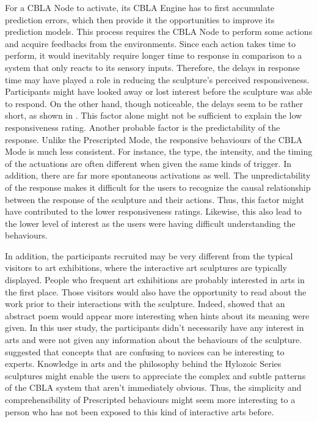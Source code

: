 For a CBLA Node to activate, its CBLA Engine has to first accumulate prediction errors, which then provide it the opportunities to improve its prediction models. This process requires the CBLA Node to perform some actions and acquire feedbacks from the environments. Since each action takes time to perform, it would inevitably require longer time to response in comparison to a system that only reacts to its sensory inputs.
Therefore, the delays in response time may have played a role in reducing the sculpture's perceived responsiveness. Participants might have looked away or lost interest before the sculpture was able to respond. 
On the other hand, though noticeable, the delays seem to be rather short, as shown in . This factor alone might not be sufficient to explain the low responsiveness rating. Another probable factor is the predictability of the response. Unlike the Prescripted Mode, the responsive behaviours of the CBLA Mode is much less consistent. For instance, the type,  the intensity, and the timing of the actuations are often different when given the same kinds of trigger. In addition, there are far more spontaneous activations as well. The unpredictability of the response makes it difficult for the users to recognize the causal relationship between the response of the sculpture and their actions. Thus, this factor might have contributed to the lower responsiveness ratings. Likewise, this also lead to the lower level of interest as the users were having difficult understanding the behaviours. 

In addition, the participants recruited may be very different from the typical visitors to art exhibitions, where the interactive art sculptures are typically displayed. People who frequent art exhibitions are probably interested in arts in the first place. Those visitors would also have the opportunity to read about the work prior to their interactions with the sculpture. Indeed, \cite{Silvia2005} showed that an abstract poem would appear more interesting when hints about its meaning were given. In this user study, the participants didn't necessarily have any interest in arts and were not given any information about the behaviours of the sculpture. \cite{Silvia2008} suggested that concepts that are confusing to novices can be interesting to experts. Knowledge in arts and the philosophy behind the Hylozoic Series sculptures might enable the users to appreciate the complex and subtle patterns of the CBLA system that aren't immediately obvious. Thus, the simplicity and comprehensibility of Prescripted behaviours might seem more interesting to a person who has not been exposed to this kind of interactive arts before. 


